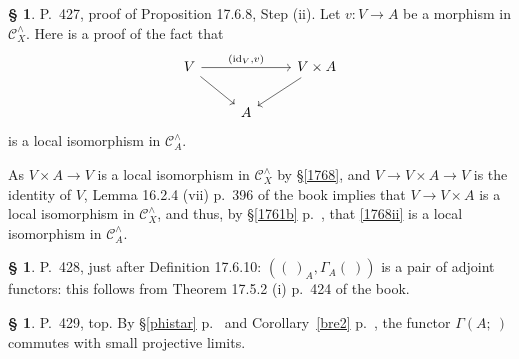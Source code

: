 \documentclass[12pt]{article}
\theoremstyle{remark}
\theoremstyle{definition}
\newtheorem{s}[thm]{\S}
\newcommand{\C}{\mathcal C}
\DeclareMathOperator{\id}{id}
\begin{document}
%

\begin{s}
P.~427, proof of Proposition 17.6.8, Step (ii). Let $v:V\to A$ be a morphism in $\C_X^\wedge$. Here is a proof of the fact that 
\begin{equation}\label{1768ii}
\begin{tikzcd} 
V\ar{rr}{(\id_V,v)}\ar{dr}&&V\times A\ar{dl}\\ 
{}&A
\end{tikzcd}
\end{equation} 
is a local isomorphism in $\C_A^\wedge$. 

As $V\times A\to V$ is a local isomorphism in $\C_X^\wedge$ by \S\ref{1768}, and $V\to V\times A\to V$ is the identity of $V$, Lemma 16.2.4 (vii) p.~396 of the book implies that $V\to V\times A$ is a local isomorphism in $\C_X^\wedge$, and thus, by \S\ref{1761b} p.~\pageref{1761b}, that \eqref{1768ii} is a local isomorphism in $\C_A^\wedge$. 
\end{s} 

%

\begin{s}\label{a428}
P.~428, just after Definition 17.6.10: $((\ )_A,\Gamma_A(\ ))$ is a pair of adjoint functors: this follows from Theorem 17.5.2 (i) p.~424 of the book. 
\end{s} 

%

\begin{s}\label{429}
P.~429, top. By \S\ref{phistar} p.~\pageref{phistar} and Corollary~\ref{bre2} p.~\pageref{bre2}, the functor $\Gamma(A;\ )$ commutes with small projective limits. 
\end{s} 

%
\end{document}
